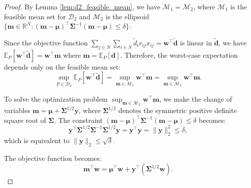 \documentclass[preprint,12pt,authoryear]{elsarticle}
\begin{document}
\begin{proof}
By Lemma \ref{lem:d2_feasible_mean}, we have $\mathcal{M}_1 = \mathcal{M}_2$, where $\mathcal{M}_1$ is the feasible mean set for $\mathcal{D}_2$ and $\mathcal{M}_2$ is the ellipsoid $\{\mathbf{m} \in \mathbb{R}^N : (\mathbf{m} - \boldsymbol{\mu})^\top \boldsymbol{\Sigma}^{-1} (\mathbf{m} - \boldsymbol{\mu}) \leqslant \delta\}$.

Since the objective function $\sum_{j \in N} \sum_{i \in N} \widetilde{d}_i r_{ij} x_{ij} = \mathbf{w}^\top \widetilde{\mathbf{d}}$ is linear in $\widetilde{\mathbf{d}}$, we have $\mathbb{E}_P[\mathbf{w}^\top \widetilde{\mathbf{d}}] = \mathbf{w}^\top \mathbf{m}$ where $\mathbf{m} = \mathbb{E}_P[\mathbf{d}]$. Therefore, the worst-case expectation depends only on the feasible mean set:
\begin{equation}
\sup_{P \in \mathcal{D}_2} \mathbb{E}_P[\mathbf{w}^\top \widetilde{\mathbf{d}}] = \sup_{\mathbf{m} \in \mathcal{M}_1} \mathbf{w}^\top \mathbf{m} = \sup_{\mathbf{m} \in \mathcal{M}_2} \mathbf{w}^\top \mathbf{m}.
\end{equation}

To solve the optimization problem $\sup_{\mathbf{m} \in \mathcal{M}_2} \mathbf{w}^\top \mathbf{m}$, we make the change of variables $\mathbf{m} = \boldsymbol{\mu} + \boldsymbol{\Sigma}^{1/2} \mathbf{y}$, where $\boldsymbol{\Sigma}^{1/2}$ denotes the symmetric positive definite square root of $\boldsymbol{\Sigma}$. The constraint $(\mathbf{m} - \boldsymbol{\mu})^\top \boldsymbol{\Sigma}^{-1} (\mathbf{m} - \boldsymbol{\mu}) \leqslant \delta$ becomes:
\begin{equation}
\mathbf{y}^\top \boldsymbol{\Sigma}^{1/2} \boldsymbol{\Sigma}^{-1} \boldsymbol{\Sigma}^{1/2} \mathbf{y} = \mathbf{y}^\top \mathbf{y} = \|\mathbf{y}\|_2^2 \leqslant \delta,
\end{equation}
which is equivalent to $\|\mathbf{y}\|_2 \leqslant \sqrt{\delta}$.

The objective function becomes:
\begin{equation}
\mathbf{m}^\top \mathbf{w} = \boldsymbol{\mu}^\top \mathbf{w} + \mathbf{y}^\top (\boldsymbol{\Sigma}^{1/2} \mathbf{w}).
\end{equation}


\end{proof}
\end{document}
